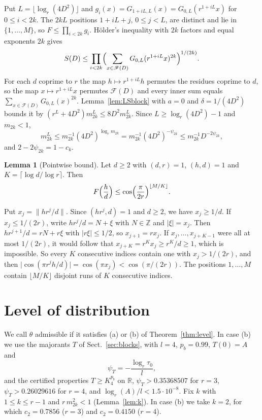 \documentclass[11pt]{amsart}
\makeatletter
\theoremstyle{definition}
\newtheorem{lemma}[theorem]{Lemma}
\numberwithin{equation}{section}
\renewenvironment{proof}[1][\proofname]{\par\pushQED{\qed}\normalfont\topsep6\p@\@plus6\p@\relax\trivlist\item[\hskip\labelsep\upshape#1.]\ignorespaces}{\popQED\endtrivlist\@endpefalse}
\newcommand{\R}{\mathbb{R}}
\newcommand{\Z}{\mathbb{Z}}
\newcommand{\FF}{\mathscr{F}}
\newcommand{\norm}[1]{\lVert #1\rVert}
\makeatother
\begin{document}
\begin{proof}
Put $L=\lfloor\log_r(4D^2)\rfloor$ and $g_i(x)=G_{1+iL,L}(x)=G_{0,L}(r^{1+iL}x)$ for $0\le i<2k$. The $2kL$ positions $1+iL+j$, $0\le j<L$, are distinct and lie in $\{1,\dots,M\}$, so $F\le\prod_{i<2k}g_i$. H\"older's inequality with $2k$ factors and equal exponents $2k$ gives
\[
S(D)\le\prod_{i<2k}\Bigl(\sum_{x\in\FF(D)}G_{0,L}(r^{1+iL}x)^{2k}\Bigr)^{1/(2k)}.
\]
For each $d$ coprime to $r$ the map $h\mapsto r^{1+iL}h$ permutes the residues coprime to $d$, so the map $x\mapsto r^{1+iL}x$ permutes $\FF(D)$ and every inner sum equals $\sum_{x\in\FF(D)}G_{0,L}(x)^{2k}$. Lemma~\ref{lem:LSblock} with $a=0$ and $\delta=1/(4D^2)$ bounds it by $(r^L+4D^2)m_{2k}^L\le8D^2m_{2k}^L$. Since $L\ge\log_r(4D^2)-1$ and $m_{2k}<1$,
\[
m_{2k}^L\le m_{2k}^{-1}(4D^2)^{\log_rm_{2k}}=m_{2k}^{-1}(4D^2)^{-\psi_{2k}}\le m_{2k}^{-1}D^{-2\psi_{2k}},
\]
and $2-2\psi_{2k}=1-c_k$.
\end{proof}

\begin{lemma}[Pointwise bound]\label{lem:pointwise}
Let $d\ge2$ with $(d,r)=1$, $(h,d)=1$ and $K=\lceil\log d/\log r\rceil$. Then
\[
F\Bigl(\frac hd\Bigr)\le\cos\Bigl(\frac\pi{2r}\Bigr)^{\lfloor M/K\rfloor}.
\]
\end{lemma}

\begin{proof}
Put $x_j=\norm{hr^j/d}$. Since $(hr^j,d)=1$ and $d\ge2$, we have $x_j\ge1/d$. If $x_j\le1/(2r)$, write $hr^j/d=N+\xi$ with $N\in\Z$ and $\lvert\xi\rvert=x_j$. Then $hr^{j+1}/d=rN+r\xi$ with $\lvert r\xi\rvert\le1/2$, so $x_{j+1}=rx_j$. If $x_j,\dots,x_{j+K-1}$ were all at most $1/(2r)$, it would follow that $x_{j+K}=r^Kx_j\ge r^K/d\ge1$, which is impossible. So every $K$ consecutive indices contain one with $x_j>1/(2r)$, and then $\lvert\cos(\pi r^jh/d)\rvert=\cos(\pi x_j)<\cos(\pi/(2r))$. The positions $1,\dots,M$ contain $\lfloor M/K\rfloor$ disjoint runs of $K$ consecutive indices.
\end{proof}

\section{Level of distribution}\label{sec:level}

We call $\theta$ admissible if it satisfies (a) or (b) of Theorem~\ref{thm:level}. In case (b) we use the majorants $T$ of Sect.~\ref{sec:blocks}, with $l=4$, $p_b=0.99$, $T(0)=A$ and
\[
\psi_T=-\frac{\log_r\tau_0}{l},
\]
and the certified properties $T\ge K_4^{p_b}$ on $\R$, $\psi_T>0.35368507$ for $r=3$, $\psi_T>0.26029616$ for $r=4$, and $\log_r(A)/l<1.5\cdot10^{-8}$. Fix $k$ with $1\le k\le r-1$ and $r\,m_{2k}^2<1$ (Lemma~\ref{lem:k}). In case (b) we take $k=2$, for which $c_2=0.7856$ ($r=3$) and $c_2=0.4150$ ($r=4$).
\end{document}

